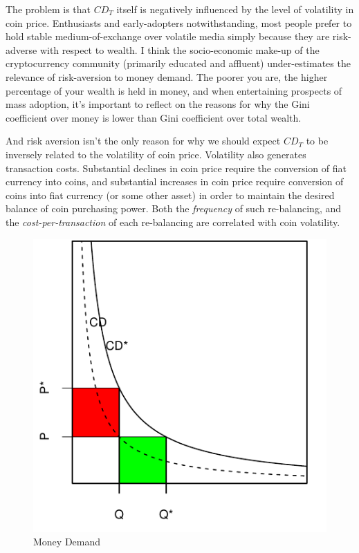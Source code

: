 \documentclass[twocolumn]{article}
\begin{document}
The problem is that $CD_{T}$ itself is negatively influenced by the
level of volatility in coin price. Enthusiasts and early-adopters
notwithstanding, most people prefer to hold stable medium-of-exchange
over volatile media simply because they are risk-adverse with respect
to wealth. I think the socio-economic make-up of the cryptocurrency
community (primarily educated and affluent) under-estimates the
relevance of risk-aversion to money demand. The poorer you are, the
higher percentage of your wealth is held in money, and when
entertaining prospects of mass adoption, it's important to reflect on
the reasons for why the Gini coefficient over money is lower than Gini
coefficient over total wealth.

And risk aversion isn't the only reason for why we should expect
$CD_{T}$ to be inversely related to the volatility of coin
price. Volatility also generates transaction costs. Substantial
declines in coin price require the conversion of fiat currency into
coins, and substantial increases in coin price require conversion of
coins into fiat currency (or some other asset) in order to maintain
the desired balance of coin purchasing power. Both the
\emph{frequency} of such re-balancing, and the
\emph{cost-per-transaction} of each re-balancing are correlated with
coin volatility.

\begin{figure}
  \begin{center}
    \includegraphics{chart1.pdf}
  \end{center}
  \caption{Money Demand}
  \label{fig:money-demand}
\end{figure}
\end{document}
